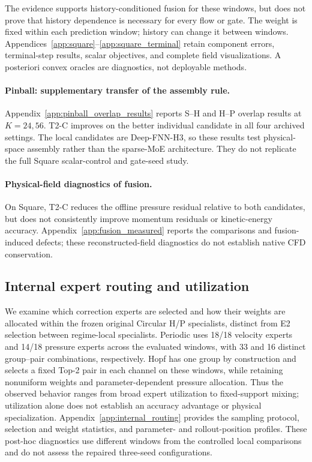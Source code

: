 The evidence supports history-conditioned fusion for these windows,
but does not prove that history dependence is necessary for every
flow or gate. The weight is fixed within each prediction window;
history can change it between windows.
Appendices~\ref{app:square}--\ref{app:square_terminal} retain component errors, terminal-step
results, scalar objectives, and complete field visualizations.
A posteriori convex oracles are diagnostics, not deployable methods.

\paragraph{Pinball: supplementary transfer of the assembly rule.}
Appendix~\ref{app:pinball_overlap_results} reports S--H and H--P
overlap results at $K=24,56$. T2-C improves on the better individual
candidate in all four archived settings. The local candidates are
Deep-FNN-H3, so these results test physical-space assembly rather than
the sparse-MoE architecture. They do not replicate the full Square
scalar-control and gate-seed study.

\paragraph{Physical-field diagnostics of fusion.}
On Square, T2-C reduces the offline pressure residual relative to
both candidates, but does not consistently improve momentum
residuals or kinetic-energy accuracy.
Appendix~\ref{app:fusion_measured} reports the comparisons and
fusion-induced defects; these reconstructed-field diagnostics
do not establish native CFD conservation.

\subsection{Internal expert routing and utilization}
\label{sec:exp_diagnostics}

We examine which correction experts are selected and how their weights
are allocated within the frozen original Circular H/P specialists,
distinct from E2 selection between regime-local specialists.
Periodic uses 18/18 velocity experts and 14/18 pressure experts across
the evaluated windows, with 33 and 16 distinct group--pair combinations,
respectively. Hopf has one group by construction and selects a fixed
Top-2 pair in each channel on these windows, while retaining nonuniform
weights and parameter-dependent pressure allocation.
Thus the observed behavior ranges from broad expert utilization to
fixed-support mixing; utilization alone does not establish an accuracy
advantage or physical specialization.
Appendix~\ref{app:internal_routing} provides the sampling protocol,
selection and weight statistics, and parameter- and rollout-position
profiles. These post-hoc diagnostics use different windows from the
controlled local comparisons and do not assess the repaired three-seed
configurations.

